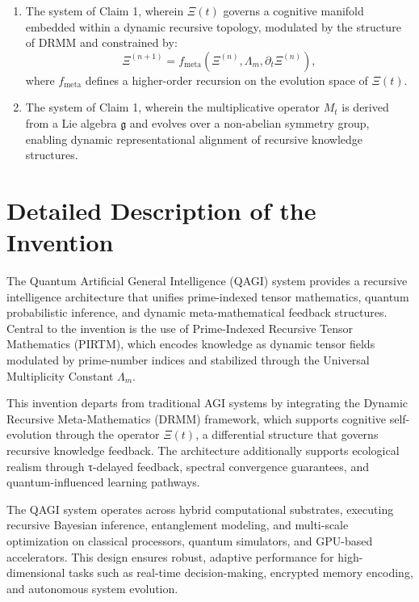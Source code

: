 \documentclass{article}
\theoremstyle{plain}
\theoremstyle{claimstyle}
\begin{document}
\begin{enumerate}
\begin{enumerate}
        \item dynamically updating keys in response to recursive tensor changes and observed adversarial entropy, thereby securing system communications against post-quantum attacks.
    \end{enumerate}

\item The system of Claim 1, wherein $\Xi(t)$ governs a cognitive manifold embedded within a dynamic recursive topology, modulated by the structure of DRMM and constrained by:
    \[
    \Xi^{(n+1)} = f_{\text{meta}}\left( \Xi^{(n)}, \Lambda_m, \partial_t \Xi^{(n)} \right),
    \]
    where $f_{\text{meta}}$ defines a higher-order recursion on the evolution space of $\Xi(t)$.
    
\item The system of Claim 1, wherein the multiplicative operator $M_t$ is derived from a Lie algebra $\mathfrak{g}$ and evolves over a non-abelian symmetry group, enabling dynamic representational alignment of recursive knowledge structures.

\end{enumerate}
\section{Detailed Description of the Invention}

The Quantum Artificial General Intelligence (QAGI) system provides a recursive intelligence architecture that unifies prime-indexed tensor mathematics, quantum probabilistic inference, and dynamic meta-mathematical feedback structures. Central to the invention is the use of Prime-Indexed Recursive Tensor Mathematics (PIRTM), which encodes knowledge as dynamic tensor fields modulated by prime-number indices and stabilized through the Universal Multiplicity Constant $\Lambda_m$.

This invention departs from traditional AGI systems by integrating the Dynamic Recursive Meta-Mathematics (DRMM) framework, which supports cognitive self-evolution through the operator $\Xi(t)$, a differential structure that governs recursive knowledge feedback. The architecture additionally supports ecological realism through τ-delayed feedback, spectral convergence guarantees, and quantum-influenced learning pathways.

The QAGI system operates across hybrid computational substrates, executing recursive Bayesian inference, entanglement modeling, and multi-scale optimization on classical processors, quantum simulators, and GPU-based accelerators. This design ensures robust, adaptive performance for high-dimensional tasks such as real-time decision-making, encrypted memory encoding, and autonomous system evolution.
\end{document}

